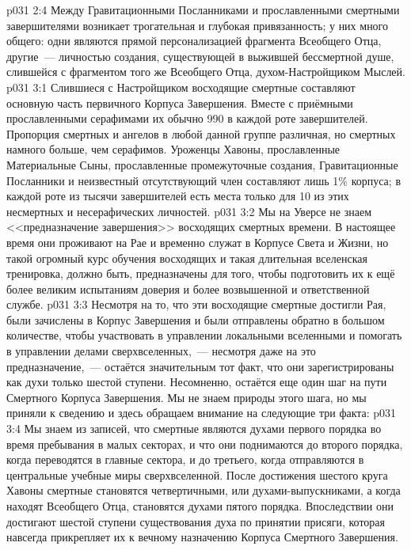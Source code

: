 \vs p031 2:4 Между Гравитационными Посланниками и прославленными смертными завершителями возникает трогательная и глубокая привязанность; у них много общего: одни являются прямой персонализацией фрагмента Всеобщего Отца, другие~--- личностью создания, существующей в выжившей бессмертной душе, слившейся с фрагментом того же Всеобщего Отца, духом\hyp{}Настройщиком Мыслей.
\vs p031 3:1 Слившиеся с Настройщиком восходящие смертные составляют основную часть первичного Корпуса Завершения. Вместе с приёмными прославленными серафимами их обычно 990 в каждой роте завершителей. Пропорция смертных и ангелов в любой данной группе различная, но смертных намного больше, чем серафимов. Уроженцы Хавоны, прославленные Материальные Сыны, прославленные промежуточные создания, Гравитационные Посланники и неизвестный отсутствующий член составляют лишь 1\% корпуса; в каждой роте из тысячи завершителей есть места только для 10 из этих несмертных и несерафических личностей.
\vs p031 3:2 Мы на Уверсе не знаем <<предназначение завершения>> восходящих смертных времени. В настоящее время они проживают на Рае и временно служат в Корпусе Света и Жизни, но такой огромный курс обучения восходящих и такая длительная вселенская тренировка, должно быть, предназначены для того, чтобы подготовить их к ещё более великим испытаниям доверия и более возвышенной и ответственной службе.
\vs p031 3:3 \pc Несмотря на то, что эти восходящие смертные достигли Рая, были зачислены в Корпус Завершения и были отправлены обратно в большом количестве, чтобы участвовать в управлении локальными вселенными и помогать в управлении делами сверхвселенных,~--- несмотря даже на это  предназначение,~--- остаётся значительным тот факт, что они зарегистрированы как духи только шестой ступени. Несомненно, остаётся еще один шаг на пути Смертного Корпуса Завершения. Мы не знаем природы этого шага, но мы приняли к сведению и здесь обращаем внимание на следующие три факта:
\vs p031 3:4 Мы знаем из записей, что смертные являются духами первого порядка во время пребывания в малых секторах, и что они поднимаются до второго порядка, когда переводятся в главные сектора, и до третьего, когда отправляются в центральные учебные миры сверхвселенной. После достижения шестого круга Хавоны смертные становятся четвертичными, или духами\hyp{}выпускниками, а когда находят Всеобщего Отца, становятся духами пятого порядка. Впоследствии они достигают шестой ступени существования духа по принятии присяги, которая навсегда прикрепляет их к вечному назначению Корпуса Смертного Завершения.
